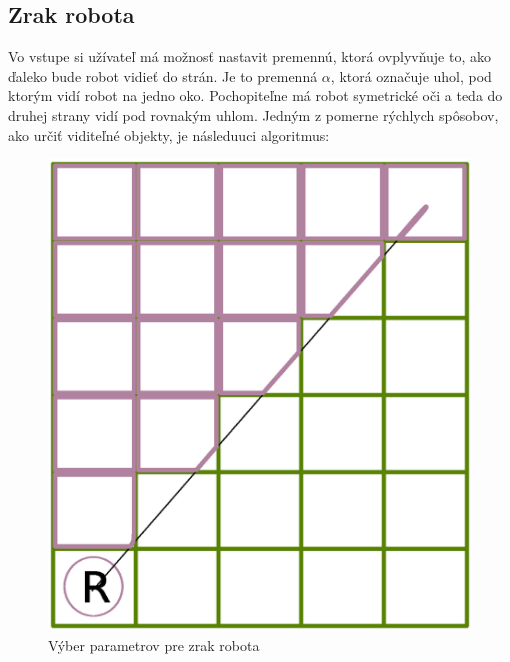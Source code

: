 \subsection{Zrak robota}
Vo vstupe si užívateľ má možnosť nastavit premennú, ktorá ovplyvňuje to, ako ďaleko bude robot vidieť do strán. Je to premenná $\alpha$, ktorá označuje uhol, pod ktorým vidí robot na jedno oko. Pochopiteľne má robot symetrické oči a teda do druhej strany vidí pod rovnakým uhlom. Jedným z pomerne rýchlych spôsobov, ako určiť viditeľné objekty, je následuuci algoritmus:

\begin{figure}
\centering
\includegraphics[totalheight=0.2\textheight,width=.6\textwidth]{chooseVisible}
\caption {Výber parametrov pre zrak robota}
\label{choosing}
\end{figure}


